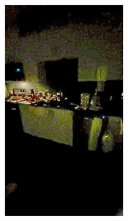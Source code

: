 \documentclass[letterpaper,12pt]{article}
\begin{document}
\begin{figure}[htbp]
\begin{subfigure}{0.128\textwidth}
			\includegraphics[width=\linewidth]{LoLi-Phone-imgT/KinD++}
			\captionsetup{font=scriptsize}
			\caption{}
			\label{fig: LoLi-Phone-imgT_g}
		\end{subfigure}\\
		\begin{subfigure}{0.128\textwidth}

\end{subfigure}
\end{figure}
\end{document}
